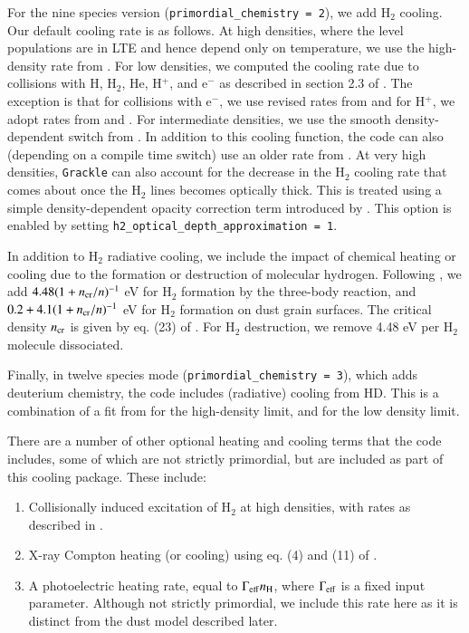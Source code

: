 For the nine species version (\texttt{primordial\_chemistry = 2}), we add H$_2$ cooling.  Our default cooling rate is as follows.  At high densities, where the level populations are in LTE and hence depend only on temperature, we use the high-density rate from \citet{1998A&A...335..403G}. For low densities, we computed the cooling rate due to collisions with H, H$_2$, He, H$^+$, and e$^-$ as described in section 2.3 of  \citet{2008MNRAS.388.1627G}.  The exception is that for collisions with e$^-$, we use revised rates from \citet{yoon2008cross} and for H$^+$, we adopt rates from \citet{2011PhRvL.107b3201H} and \citet{2012PhRvL.108j9903H}.  For intermediate densities, we use the smooth density-dependent switch from \citet{1998A&A...335..403G}.  In addition to this cooling function, the code can also (depending on a compile time switch) use an older rate from \citet{1983ApJ...270..578L}. At very high densities, \texttt{Grackle} can also account for the decrease in the H$_{2}$ cooling rate that comes about once the H$_{2}$ lines becomes optically thick. This is treated using a simple density-dependent opacity correction term introduced by \citet{2004MNRAS.348.1019R}. This option is enabled by setting \texttt{h2\_optical\_depth\_approximation = 1}.

\label{sec:chemheat}

In addition to H$_2$ radiative cooling, we include the impact of chemical heating or cooling due to the formation or destruction of molecular hydrogen.  Following \citet{2000ApJ...534..809O}, we add $4.48 (1 + n_{\rm cr}/n)^{-1}$ eV for H$_2$ formation by the three-body reaction, and $0.2 + 4.1(1 + n_{\rm cr}/n)^{-1}$ eV for H$_2$ formation on dust grain surfaces.  The critical density $n_{\rm cr}$ is given by eq. (23) of  \citet{2000ApJ...534..809O}.  For H$_2$ destruction, we remove 4.48 eV per H$_2$ molecule dissociated.

Finally, in twelve species mode (\texttt{primordial\_chemistry = 3}), which adds deuterium chemistry, the code includes (radiative) cooling from HD.  This is a combination of a fit from \citet{2011MNRAS.415..487C} for the high-density limit, and \citet{2007MNRAS.382..133W} for the low density limit.

There are a number of other optional heating and cooling terms that the code includes, some of which are not strictly primordial, but are included as part of this cooling package.  These include:  
\begin{enumerate}
\item Collisionally induced excitation of H$_2$ at high densities, with rates as described in \citet{2004MNRAS.348.1019R}.
\item X-ray Compton heating (or cooling) using eq. (4) and (11) of \citet{1999ApJ...517L...9M}.
\item A photoelectric heating rate, equal to $\Gamma_{\rm eff} n_{\rm H}$, where $\Gamma_{\rm eff}$ is a fixed input parameter.  Although not strictly primordial, we include this rate here as it is distinct from the dust model described later.
\end{enumerate}


